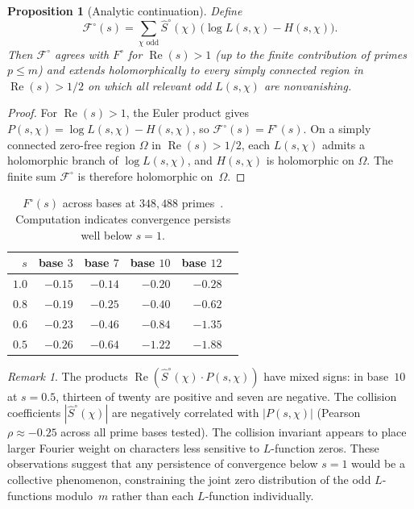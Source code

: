 \documentclass[12pt]{amsart}
\newtheorem{proposition}[theorem]{Proposition}
\theoremstyle{definition}
\theoremstyle{remark}
\newtheorem{remark}[theorem]{Remark}
\begin{document}
\begin{proposition}[Analytic continuation]
\label{prop:analytic}
Define
\[
\mathcal{F}^{\circ}(s) = \sum_{\chi \text{ odd}}
\hat{S}^{\circ}(\chi)\,
\bigl(\log L(s, \chi) - H(s, \chi)\bigr).
\]
Then $\mathcal{F}^{\circ}$ agrees with $F^{\circ}$
for $\operatorname{Re}(s) > 1$ (up to the finite
contribution of primes $p \le m$) and extends
holomorphically to every simply connected region in
$\operatorname{Re}(s) > 1/2$ on which all relevant
odd $L(s, \chi)$ are nonvanishing.
\end{proposition}

\begin{proof}
For $\operatorname{Re}(s) > 1$, the Euler product gives
$P(s, \chi) = \log L(s, \chi) - H(s, \chi)$, so
$\mathcal{F}^{\circ}(s) = F^{\circ}(s)$. On a simply
connected zero-free region $\Omega$ in
$\operatorname{Re}(s) > 1/2$, each $L(s, \chi)$ admits
a holomorphic branch of $\log L(s, \chi)$, and
$H(s, \chi)$ is holomorphic on $\Omega$. The finite
sum $\mathcal{F}^{\circ}$ is therefore holomorphic
on~$\Omega$.
\end{proof}

\begin{table}[h]
\centering
\begin{tabular}{rrrrrr}
\toprule
$s$ & base $3$ & base $7$ & base $10$ & base $12$ \\
\midrule
$1.0$ & $-0.15$ & $-0.14$ & $-0.20$ & $-0.28$ \\
$0.8$ & $-0.19$ & $-0.25$ & $-0.40$ & $-0.62$ \\
$0.6$ & $-0.23$ & $-0.46$ & $-0.84$ & $-1.35$ \\
$0.5$ & $-0.26$ & $-0.64$ & $-1.22$ & $-1.88$ \\
\bottomrule
\end{tabular}
\caption{$F^{\circ}(s)$ across bases at $348{,}488$
primes~\cite{nfield}. Computation indicates convergence
persists
well below $s = 1$.}
\end{table}

\begin{remark}
The products
$\operatorname{Re}(\hat{S}^{\circ}(\chi) \cdot
P(s, \chi))$ have mixed signs: in base~$10$ at
$s = 0.5$, thirteen of twenty are positive and
seven are negative. The collision coefficients
$|\hat{S}^{\circ}(\chi)|$ are negatively correlated
with $|P(s, \chi)|$ (Pearson $\rho \approx -0.25$
across all prime bases tested). The collision
invariant appears to place larger Fourier weight on
characters less sensitive to $L$-function zeros.
These observations suggest that any persistence of
convergence below $s = 1$ would be a collective
phenomenon, constraining the joint zero distribution
of the odd $L$-functions modulo~$m$ rather than each
$L$-function individually.
\end{remark}
\end{document}
